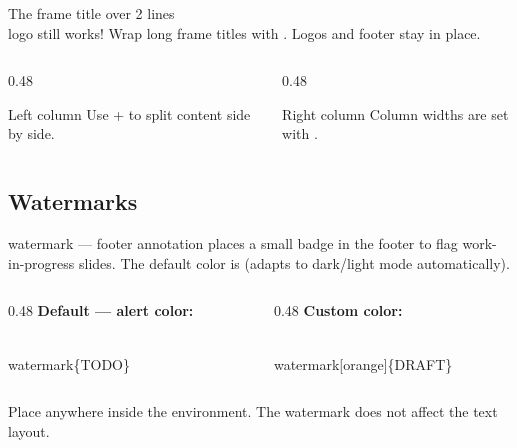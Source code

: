 \documentclass[presentation, aspectratio=169]{beamer}
\begin{document}
\begin{frame}{The frame title over 2 lines \\ logo still works!}
  Wrap long frame titles with \inlinecode{\\\\}. Logos and footer stay in place.

  \vspace{0.4em}
  \begin{columns}
    \begin{column}{0.48\columnwidth}
      \begin{block}{Left column}
        Use  +  to split content side by side.
      \end{block}
    \end{column}
    \begin{column}{0.48\columnwidth}
      \begin{block}{Right column}
        Column widths are set with .
      \end{block}
    \end{column}
  \end{columns}
\end{frame}

\subsection{Watermarks}

\begin{frame}[fragile]{watermark --- footer annotation}
   places a small badge in the footer
  to flag work-in-progress slides.
  The default color is  (adapts to dark/light mode automatically).

  \vspace{0.4em}
  \begin{columns}[t, onlytextwidth]
    \begin{column}{0.48\textwidth}
      \textbf{Default --- alert color:}
\begin{codeblock}
\\watermark\{TODO\}
\end{codeblock}
    \end{column}
    \begin{column}{0.48\textwidth}
      \textbf{Custom color:}
\begin{codeblock}
\\watermark[orange]\{DRAFT\}
\end{codeblock}
    \end{column}
  \end{columns}

  \vspace{0.3em}
  Place \inlinecode{\\watermark} anywhere inside the  environment.
  The watermark does not affect the text layout.
\end{frame}
\end{document}
